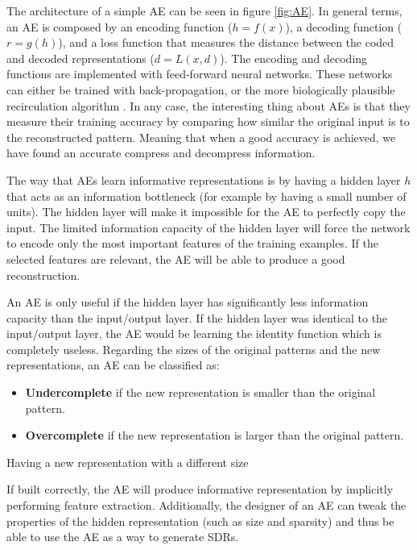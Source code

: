 The architecture of a simple AE can be seen in figure \ref{fig:AE}.
In general terms, an AE is composed by an encoding function ($h=f(x)$), a decoding function ($r=g(h)$), and a loss function that measures the distance between the coded and decoded representations ($d = L(x,d)$). The encoding and decoding functions are implemented with feed-forward neural networks. These networks can either be trained with back-propagation, or the more biologically plausible recirculation algorithm \cite{hinton1988learning}.
In any case, the interesting thing about AEs is that they measure their training accuracy by comparing how similar the original input is to the reconstructed pattern. Meaning that when a good accuracy is achieved, we have found an accurate compress and decompress information.

The way that AEs learn informative representations is by having a hidden layer $h$ that acts as an information bottleneck (for example by having a small number of units). The hidden layer will make it impossible for the AE to perfectly copy the input. The limited information capacity of the hidden layer will force the network to encode only the most important features of the training examples. If the selected features are relevant, the AE will be able to produce a good reconstruction.

An AE is only useful if the hidden layer has significantly less information capacity than the input/output layer. If the hidden layer was identical to the input/output layer, the AE would be learning the identity function which is completely useless. Regarding the sizes of the original patterns and the new representations, an AE can be classified as:
\begin{itemize}
    \item \textbf{Undercomplete} if the new representation is smaller than the original pattern.
    \item \textbf{Overcomplete} if the new representation is larger than the original pattern.
\end{itemize}
Having a new representation with a different size

If built correctly, the AE will produce informative representation by implicitly performing feature extraction. Additionally, the designer of an AE can tweak the properties of the hidden representation (such as size and sparsity) and thus be able to use the AE as a way to generate SDRs.

